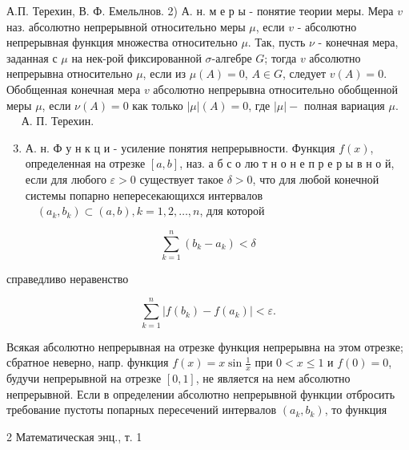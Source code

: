 \documentclass[10pt]{article}
\begin{document}
А.П. Терехин, В. Ф. Емельлнов. 2) А. н. м е р ы - понятие теории меры. Мера $v$ наз. абсолютно непрерывной относительно меры $\mu$, если $v$ - абсолютно непрерывная функция множества относительно $\mu$. Так, пусть $\nu$ - конечная мера, заданная с $\mu$ на нек-рой фиксированной $\sigma$-алгебре $G$; тогда $v$ абсолютно непрерывна относительно $\mu$, если из $\mu(A)=0$, $A \in G$, следует $v(A)=0$. Обобщенная конечная мера $v$ абсолютно непрерывна относительно обобщенной меры $\mu$, если $\nu(A)=0$ как только $|\mu|(A)=0$, где $|\mu|-$ полная вариация $\mu$. $\quad$ А. П. Терехин.



\begin{enumerate}

  \setcounter{enumi}{2}

  \item А. н. Ф у н к ц и - усиление понятия непрерывности. Функция $f(x)$, определенная на отрезке $[a, b]$, наз. а б с о лю т н о н е п р е р ы в н о й, если для любого $\varepsilon>0$ существует такое $\delta>0$, что для любой конечной системы попарно непересекающихся интервалов $\quad\left(a_{k}, b_{k}\right) \subset(a, b), k=1,2, \ldots, n$, для которой

\end{enumerate}



\[

\sum_{k=1}^{n}\left(b_{k}-a_{k}\right)<\delta

\]



справедливо неравенство



\[

\sum_{k=1}^{n}\left|f\left(b_{k}\right)-f\left(a_{k}\right)\right|<\varepsilon .

\]



Всякая абсолютно непрерывная на отрезке функция непрерывна на этом отрезке; сбратное неверно, напр. функция $f(x)=x \sin \frac{1}{x}$ при $0<x \leqslant 1$ и $f(0)=0$, будучи непрерывной на отрезке $[0,1]$, не является на нем абсолютно непрерывной. Если в определении абсолютно непрерывной функции отбросить требование пустоты попарных пересечений интервалов $\left(a_{k}, b_{k}\right)$, то функция



2 Математическая энц., т. 1
\end{document}
